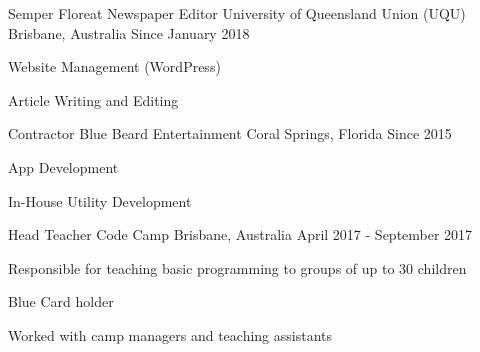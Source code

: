 


\begin{cventries}


\cventry
{Semper Floreat Newspaper Editor} %
{University of Queensland Union (UQU)} %
{Brisbane, Australia} %
{Since January 2018} %
{ %
\begin{cvitems}
\item {Website Management (WordPress)}
\item {Article Writing and Editing}
\end{cvitems}
}


\cventry
{Contractor} %
{Blue Beard Entertainment} %
{Coral Springs, Florida} %
{Since 2015} %
{ %
\begin{cvitems}
\item {App Development}
\item {In-House Utility Development}
\end{cvitems}
}


\cventry
{Head Teacher} %
{Code Camp} %
{Brisbane, Australia} %
{April 2017 - September 2017} %
{ %
\begin{cvitems}
\item {Responsible for teaching basic programming to groups of up to 30 children}
\item {Blue Card holder}
\item {Worked with camp managers and teaching assistants}
\end{cvitems}
}


\end{cventries}